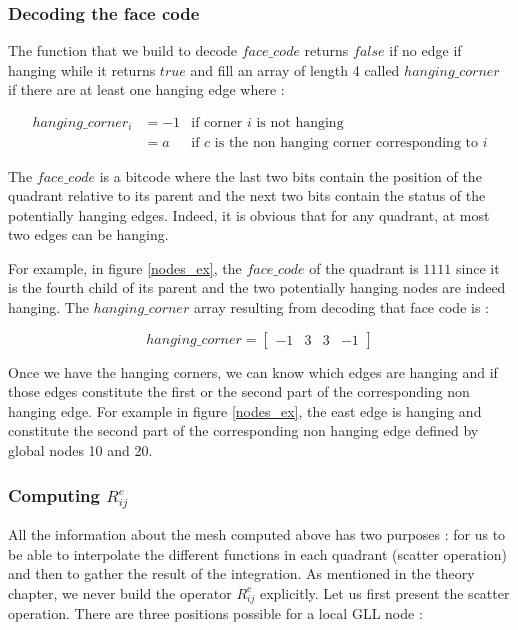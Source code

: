 \subsubsection{Decoding the face code}

The function that we build to decode $face\_code$ returns $false$ if no edge if hanging while it returns $true$ and fill an array of length 4 called $hanging\_corner$ if there are at least one hanging edge where : 

\begin{align*}
hanging\_corner_i &= -1 &\text{if corner $i$ is not hanging}\\
&= a &\text{if $c$ is the non hanging corner corresponding to $i$}
\end{align*}

The $face\_code$ is a bitcode where the last two bits contain the position of the quadrant relative to its parent and the next two bits contain the status of the potentially hanging edges. Indeed, it is obvious that for any quadrant, at most two edges can be hanging. 

For example, in figure \ref{nodes_ex}, the $face\_code$ of the quadrant is $1111$ since it is the fourth child of its parent and the two potentially hanging nodes are indeed hanging. The $hanging\_corner$ array resulting from decoding that face code is : 

$$hanging\_corner = \begin{bmatrix}
-1 &3& 3& -1
\end{bmatrix}$$

Once we have the hanging corners, we can know which edges are hanging and if those edges constitute the first or the second part of the corresponding non hanging edge. For example in figure \ref{nodes_ex}, the east edge is hanging and constitute the second part of the corresponding non hanging edge defined by global nodes 10 and 20. 

\subsubsection{Computing $R_{ij}^e$}

All the information about the mesh computed above has two purposes : for us to be able to interpolate the different functions in each quadrant (scatter operation) and then to gather the result of the integration. As mentioned in the theory chapter, we never build the operator $R_{ij}^e$ explicitly. Let us first present the scatter operation. There are three positions possible for a local GLL node : 

